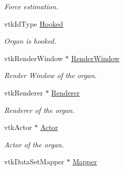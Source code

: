 \begin{DoxyCompactItemize}
\begin{DoxyCompactList}\small\item\em Force estimation. \item\end{DoxyCompactList}\item 
\hypertarget{classvtkOrgan_adee057963e367b6ea0d7cd876546d34b}{
vtkIdType \hyperlink{classvtkOrgan_adee057963e367b6ea0d7cd876546d34b}{Hooked}}
\label{classvtkOrgan_adee057963e367b6ea0d7cd876546d34b}

\begin{DoxyCompactList}\small\item\em Organ is hooked. \item\end{DoxyCompactList}\item 
\hypertarget{classvtkOrgan_a64077d281d2c229bc13e1fa0f619824a}{
vtkRenderWindow $\ast$ \hyperlink{classvtkOrgan_a64077d281d2c229bc13e1fa0f619824a}{RenderWindow}}
\label{classvtkOrgan_a64077d281d2c229bc13e1fa0f619824a}

\begin{DoxyCompactList}\small\item\em Render Window of the organ. \item\end{DoxyCompactList}\item 
\hypertarget{classvtkOrgan_ac9e062f1471c9eb4c10665556c924941}{
vtkRenderer $\ast$ \hyperlink{classvtkOrgan_ac9e062f1471c9eb4c10665556c924941}{Renderer}}
\label{classvtkOrgan_ac9e062f1471c9eb4c10665556c924941}

\begin{DoxyCompactList}\small\item\em Renderer of the organ. \item\end{DoxyCompactList}\item 
\hypertarget{classvtkOrgan_ab52d491e587bd24a4a22ee27081b9eb0}{
vtkActor $\ast$ \hyperlink{classvtkOrgan_ab52d491e587bd24a4a22ee27081b9eb0}{Actor}}
\label{classvtkOrgan_ab52d491e587bd24a4a22ee27081b9eb0}

\begin{DoxyCompactList}\small\item\em Actor of the organ. \item\end{DoxyCompactList}\item 
\hypertarget{classvtkOrgan_a3bcab5f9352bb68a51d87ad45ab49745}{
vtkDataSetMapper $\ast$ \hyperlink{classvtkOrgan_a3bcab5f9352bb68a51d87ad45ab49745}{Mapper}}
\label{classvtkOrgan_a3bcab5f9352bb68a51d87ad45ab49745}


\end{DoxyCompactItemize}
